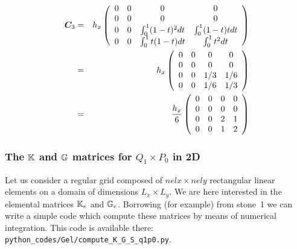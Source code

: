 \begin{eqnarray}
{\bm C}_3 
&=&
h_x
\left(
\begin{array}{cccc}
0 & 0 & 0 & 0 \\
0 & 0 & 0 & 0 \\ 
0 & 0 & \int_{0}^1 (1-t)^2 dt & \int_{0}^1 (1-t)t  dt \\
0 & 0 & \int_{0}^1 t(1-t) dt & \int_{0}^1 t^2 dt 
\end{array}
\right) \nonumber\\
&=& 
h_x
\left(
\begin{array}{cccc}
0 & 0 & 0 & 0 \\ 
0 & 0 & 0 & 0  \\
0 & 0 & 1/3 & 1/6 \\
0 & 0 & 1/6 & 1/3 
\end{array}
\right) \nonumber\\
&=& 
\frac{h_x}{6}
\left(
\begin{array}{cccc}
0 & 0 & 0 & 0 \\ 
0 & 0 & 0 & 0  \\
0 & 0 & 2 & 1 \\
0 & 0 & 1 & 2 
\end{array}
\right) 
\end{eqnarray}



\subsubsection{The ${\mathbb{K}}$ and ${\mathbb{G}}$ matrices for $Q_1 \times P_0$ in 2D \label{app:q1p0_elmats}}


Let us consider a regular grid composed of $nelx \times nely$ rectangular linear elements on a domain of dimensions $L_x\times L_y$. We are here interested in the elemental matrices ${\mathbb{K}}_e$ and ${\mathbb{G}}_e$. Borrowing (for example) from stone~1 we can write a simple code which compute these matrices by means of numerical integration. This code is available there: {\tt python\_codes/Gel/compute\_K\_G\_S\_q1p0.py}.


